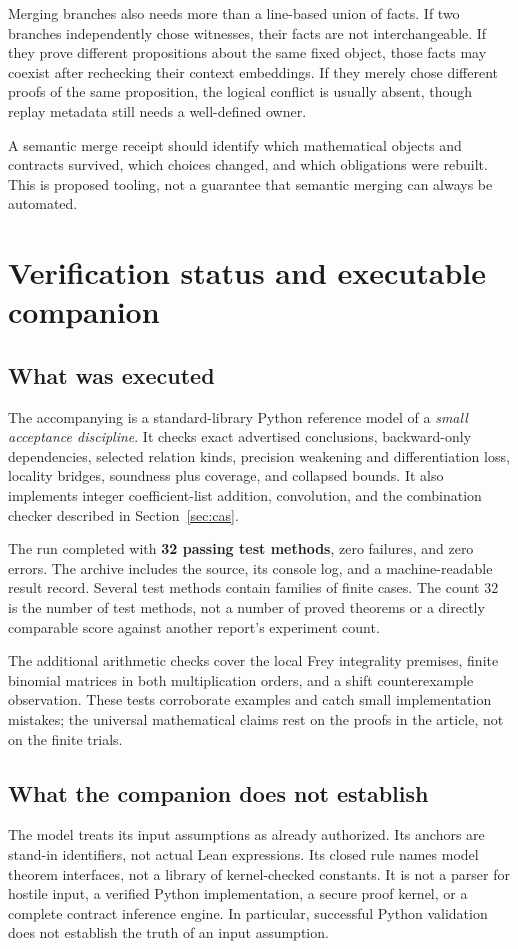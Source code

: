 \documentclass[11pt,letterpaper]{article}
\newcommand{\code}[1]{\texttt{\detokenize{#1}}}
\theoremstyle{definition}
\theoremstyle{remark}
\begin{document}
Merging branches also needs more than a line-based union of facts. If two
branches independently chose witnesses, their facts are not interchangeable.
If they prove different propositions about the same fixed object, those facts
may coexist after rechecking their context embeddings. If they merely chose
different proofs of the same proposition, the logical conflict is usually
absent, though replay metadata still needs a well-defined owner.

A semantic merge receipt should identify which mathematical objects and
contracts survived, which choices changed, and which obligations were rebuilt.
This is proposed tooling, not a guarantee that semantic merging can always be
automated.

\section{Verification status and executable companion}\label{sec:status}

\subsection{What was executed}
The accompanying \code{contract_model.py} is a standard-library Python reference
model of a \emph{small acceptance discipline}. It checks exact advertised
conclusions, backward-only dependencies, selected relation kinds, precision
weakening and differentiation loss, locality bridges, soundness plus coverage,
and collapsed bounds. It also implements integer coefficient-list addition,
convolution, and the combination checker described in
Section~\ref{sec:cas}.

The run completed with \textbf{32 passing test methods}, zero failures, and zero
errors. The archive includes the source, its console log, and a machine-readable
result record. Several test methods contain families of finite cases. The count
32 is the number of test methods, not a number of proved theorems or a directly
comparable score against another report's experiment count.

The additional arithmetic checks cover the local Frey integrality premises,
finite binomial matrices in both multiplication orders, and a shift
counterexample observation. These tests corroborate examples and catch small
implementation mistakes; the universal mathematical claims rest on the proofs
in the article, not on the finite trials.

\subsection{What the companion does not establish}
The model treats its input assumptions as already authorized. Its anchors are
stand-in identifiers, not actual Lean expressions. Its closed rule names model
theorem interfaces, not a library of kernel-checked constants. It is not a
parser for hostile input, a verified Python implementation, a secure proof
kernel, or a complete contract inference engine. In particular, successful
Python validation does not establish the truth of an input assumption.
\end{document}
